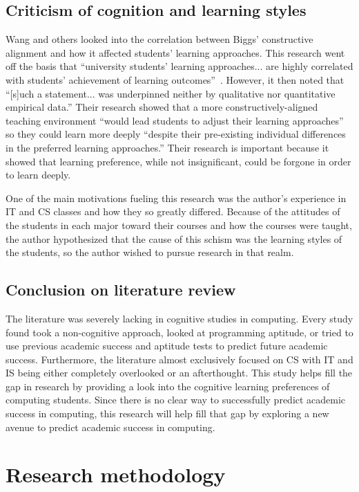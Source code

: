 \subsection{Criticism of cognition and learning styles}
Wang and others looked into the correlation between Biggs' constructive alignment and how it affected students' learning approaches. This research went off the basis that ``university students' learning approaches... are highly correlated with students' achievement of learning outcomes''~\citep{wang2013}. However, it then noted that ``[s]uch a statement... was underpinned neither by qualitative nor quantitative empirical data.'' Their research showed that a more constructively-aligned teaching environment ``would lead students to adjust their learning approaches'' so they could learn more deeply ``despite their pre-existing individual differences
in the preferred learning approaches.'' Their research is important because it showed that learning preference, while not insignificant, could be forgone in order to learn deeply.

One of the main motivations fueling this research was the author's experience in IT and CS classes and how they so greatly differed. Because of the attitudes of the students in each major toward their courses and how the courses were taught, the author hypothesized that the cause of this schism was the learning styles of the students, so the author wished to pursue research in that realm.

\subsection{Conclusion on literature review}
The literature was severely lacking in cognitive studies in computing. Every study found took a non-cognitive approach, looked at programming aptitude, or tried to use previous academic success and aptitude tests to predict future academic success. Furthermore, the literature almost exclusively focused on CS with IT and IS being either completely overlooked or an afterthought. This study helps fill the gap in research by providing a look into the cognitive learning preferences of computing students. Since there is no clear way to successfully predict academic success in computing, this research will help fill that gap by exploring a new avenue to predict academic success in computing.

\section{Research methodology}
